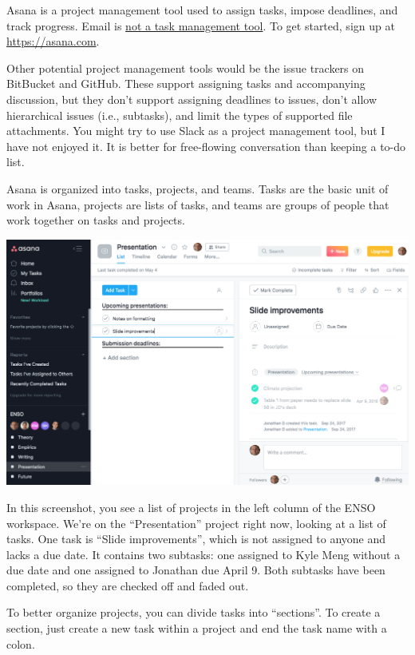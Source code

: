 Asana is a project management tool used to assign tasks, impose deadlines, and track progress.
Email is \href{https://facilethings.com/blog/en/your-email-is-not-a-todo-list}{not a task management tool}.
To get started, sign up at \url{https://asana.com}.

Other potential project management tools would be the issue trackers on BitBucket and GitHub.
These support assigning tasks and accompanying discussion,
but they don't support assigning deadlines to issues, don't allow hierarchical issues (i.e., subtasks), and limit the types of supported file attachments.
You might try to use Slack as a project management tool, but I have not enjoyed it.
It is better for free-flowing conversation than keeping a to-do list.

Asana is organized into tasks, projects, and teams.
Tasks are the basic unit of work in Asana,
projects are lists of tasks, and
teams are groups of people that work together on tasks and projects.

\begin{center}
\includegraphics[width=\textwidth]{./figures/workflow/asana_screenshot1.png}
\end{center}

In this screenshot,
you see a list of projects in the left column of the ENSO workspace.
We're on the ``Presentation'' project right now, looking at a list of tasks.
One task is ``Slide improvements'', which is not assigned to anyone and lacks a due date.
It contains two subtasks:
one assigned to Kyle Meng without a due date
and
one assigned to Jonathan due April 9.
Both subtasks have been completed, so they are checked off and faded out.

To better organize projects, you can divide tasks into ``sections''.
To create a section, just create a new task within a project and end the task name with a colon.


